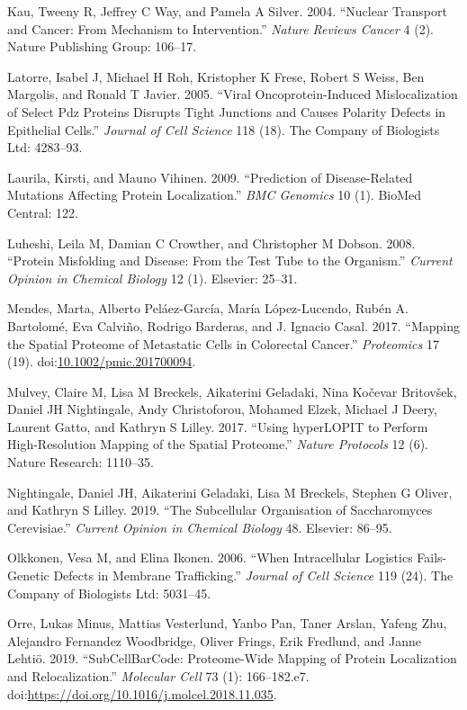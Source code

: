 \documentclass[]{article}
\begin{document}
\hypertarget{ref-Kau:2004}{}
Kau, Tweeny R, Jeffrey C Way, and Pamela A Silver. 2004. ``Nuclear
Transport and Cancer: From Mechanism to Intervention.'' \emph{Nature
Reviews Cancer} 4 (2). Nature Publishing Group: 106--17.

\hypertarget{ref-Latorre:2005}{}
Latorre, Isabel J, Michael H Roh, Kristopher K Frese, Robert S Weiss,
Ben Margolis, and Ronald T Javier. 2005. ``Viral Oncoprotein-Induced
Mislocalization of Select Pdz Proteins Disrupts Tight Junctions and
Causes Polarity Defects in Epithelial Cells.'' \emph{Journal of Cell
Science} 118 (18). The Company of Biologists Ltd: 4283--93.

\hypertarget{ref-Laurila:2009}{}
Laurila, Kirsti, and Mauno Vihinen. 2009. ``Prediction of
Disease-Related Mutations Affecting Protein Localization.'' \emph{BMC
Genomics} 10 (1). BioMed Central: 122.

\hypertarget{ref-Luheshi:2008}{}
Luheshi, Leila M, Damian C Crowther, and Christopher M Dobson. 2008.
``Protein Misfolding and Disease: From the Test Tube to the Organism.''
\emph{Current Opinion in Chemical Biology} 12 (1). Elsevier: 25--31.

\hypertarget{ref-Mendes:2017}{}
Mendes, Marta, Alberto Peláez-García, María López-Lucendo, Rubén A.
Bartolomé, Eva Calviño, Rodrigo Barderas, and J. Ignacio Casal. 2017.
``Mapping the Spatial Proteome of Metastatic Cells in Colorectal
Cancer.'' \emph{Proteomics} 17 (19).
doi:\href{https://doi.org/10.1002/pmic.201700094}{10.1002/pmic.201700094}.

\hypertarget{ref-Mulvey:2017}{}
Mulvey, Claire M, Lisa M Breckels, Aikaterini Geladaki, Nina Kočevar
Britovšek, Daniel JH Nightingale, Andy Christoforou, Mohamed Elzek,
Michael J Deery, Laurent Gatto, and Kathryn S Lilley. 2017. ``Using
hyperLOPIT to Perform High-Resolution Mapping of the Spatial Proteome.''
\emph{Nature Protocols} 12 (6). Nature Research: 1110--35.

\hypertarget{ref-Nightingale:2019}{}
Nightingale, Daniel JH, Aikaterini Geladaki, Lisa M Breckels, Stephen G
Oliver, and Kathryn S Lilley. 2019. ``The Subcellular Organisation of
Saccharomyces Cerevisiae.'' \emph{Current Opinion in Chemical Biology}
48. Elsevier: 86--95.

\hypertarget{ref-Olkkonen:2006}{}
Olkkonen, Vesa M, and Elina Ikonen. 2006. ``When Intracellular Logistics
Fails-Genetic Defects in Membrane Trafficking.'' \emph{Journal of Cell
Science} 119 (24). The Company of Biologists Ltd: 5031--45.

\hypertarget{ref-Orre:2019}{}
Orre, Lukas Minus, Mattias Vesterlund, Yanbo Pan, Taner Arslan, Yafeng
Zhu, Alejandro Fernandez Woodbridge, Oliver Frings, Erik Fredlund, and
Janne Lehtiö. 2019. ``SubCellBarCode: Proteome-Wide Mapping of Protein
Localization and Relocalization.'' \emph{Molecular Cell} 73 (1):
166--182.e7.
doi:\href{https://doi.org/https://doi.org/10.1016/j.molcel.2018.11.035}{https://doi.org/10.1016/j.molcel.2018.11.035}.
\end{document}
